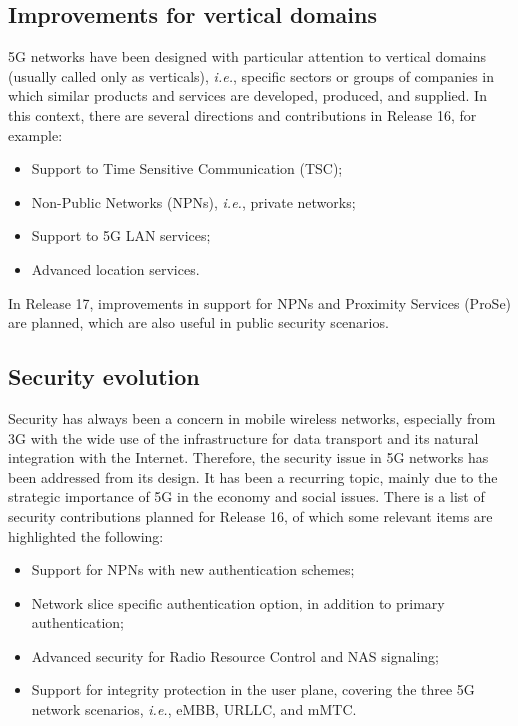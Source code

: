 \subsection*{Improvements for vertical domains}

5G networks have been designed with particular attention to vertical domains (usually called only as verticals), \textit{i.e.}, specific sectors or groups of companies in which similar products and services are developed, produced, and supplied. In this context, there are several directions and contributions in Release 16, for example:

\begin{itemize}
    \item Support to Time Sensitive Communication (TSC);
    \item Non-Public Networks (NPNs), \textit{i.e.}, private networks;
    \item Support to 5G LAN services;
    \item Advanced location services.
\end{itemize}

In Release 17, improvements in support for NPNs and Proximity Services (ProSe) are planned, which are also useful in public security scenarios.

\subsection*{Security evolution}

Security has always been a concern in mobile wireless networks, especially from 3G with the wide use of the infrastructure for data transport and its natural integration with the Internet. Therefore, the security issue in 5G networks has been addressed from its design. It has been a recurring topic, mainly due to the strategic importance of 5G in the economy and social issues. There is a list of security contributions planned for Release 16, of which some relevant items are highlighted the following:

\begin{itemize}
    \item Support for NPNs with new authentication schemes;
    \item Network slice specific authentication option, in addition to primary authentication;
    \item Advanced security for Radio Resource Control and NAS signaling;
    \item Support for integrity protection in the user plane, covering the three 5G network scenarios, \textit{i.e.}, eMBB, URLLC, and mMTC.
\end{itemize}

